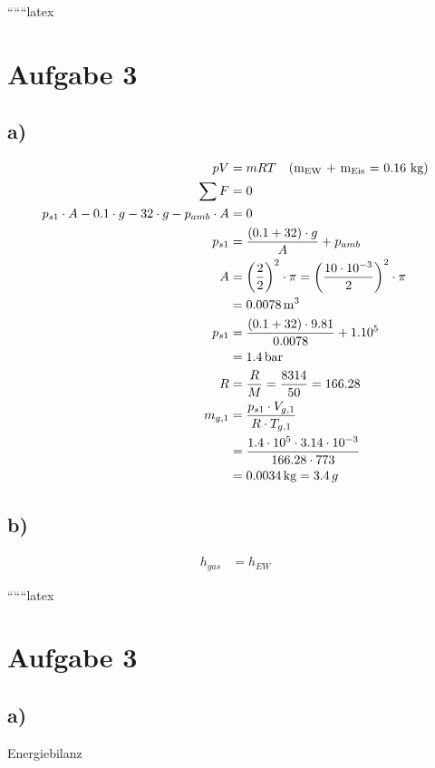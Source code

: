 
``````latex


\section*{Aufgabe 3}

\subsection*{a)}

\begin{align*}
pV &= mRT \quad \text{(m\textsubscript{EW} + m\textsubscript{Eis} = 0.16 kg)} \\
\sum F &= 0 \\
p_{s1} \cdot A - 0.1 \cdot g - 32 \cdot g - p_{amb} \cdot A &= 0 \\
p_{s1} &= \frac{(0.1 + 32) \cdot g}{A} + p_{amb} \\
A &= \left(\frac{2}{2}\right)^2 \cdot \pi = \left(\frac{10 \cdot 10^{-3}}{2}\right)^2 \cdot \pi \\
&= 0.0078 \, \text{m}^3 \\
p_{s1} &= \frac{(0.1 + 32) \cdot 9.81}{0.0078} + 1.10^5 \\
&= 1.4 \, \text{bar} \\
R &= \frac{R}{M} = \frac{8314}{50} = 166.28 \\
m_{g,1} &= \frac{p_{s1} \cdot V_{g,1}}{R \cdot T_{g,1}} \\
&= \frac{1.4 \cdot 10^5 \cdot 3.14 \cdot 10^{-3}}{166.28 \cdot 773} \\
&= 0.0034 \, \text{kg} = 3.4 \, g
\end{align*}

\subsection*{b)}

\begin{align*}
h_{gas} &= h_{EW}
\end{align*}

``````latex


\section*{Aufgabe 3}

\subsection*{a)}

Energiebilanz

